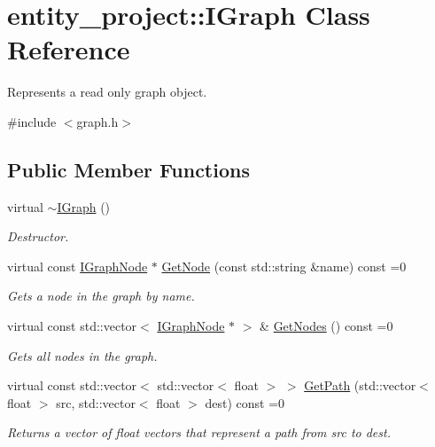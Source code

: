 \hypertarget{classentity__project_1_1IGraph}{}\section{entity\+\_\+project\+:\+:I\+Graph Class Reference}
\label{classentity__project_1_1IGraph}


Represents a read only graph object.  




{\ttfamily \#include $<$graph.\+h$>$}

\subsection*{Public Member Functions}
\begin{DoxyCompactItemize}
\item 
\mbox{\label{classentity__project_1_1IGraph_ad4eafcdb3b6902e54924a6c21e1971a0}} 
virtual \hyperlink{classentity__project_1_1IGraph_ad4eafcdb3b6902e54924a6c21e1971a0}{$\sim$\+I\+Graph} ()
\begin{DoxyCompactList}\small\item\em Destructor. \end{DoxyCompactList}\item 
\mbox{\label{classentity__project_1_1IGraph_a900c64b856e9163727693276fc870bd9}} 
virtual const \hyperlink{classentity__project_1_1IGraphNode}{I\+Graph\+Node} $\ast$ \hyperlink{classentity__project_1_1IGraph_a900c64b856e9163727693276fc870bd9}{Get\+Node} (const std\+::string \&name) const =0
\begin{DoxyCompactList}\small\item\em Gets a node in the graph by name. \end{DoxyCompactList}\item 
\mbox{\label{classentity__project_1_1IGraph_a690ed9b025c9b7709154c4fc7f89ef93}} 
virtual const std\+::vector$<$ \hyperlink{classentity__project_1_1IGraphNode}{I\+Graph\+Node} $\ast$ $>$ \& \hyperlink{classentity__project_1_1IGraph_a690ed9b025c9b7709154c4fc7f89ef93}{Get\+Nodes} () const =0
\begin{DoxyCompactList}\small\item\em Gets all nodes in the graph. \end{DoxyCompactList}\item 
virtual const std\+::vector$<$ std\+::vector$<$ float $>$ $>$ \hyperlink{classentity__project_1_1IGraph_aa96a691b82108d0901463f3cd5cd79b9}{Get\+Path} (std\+::vector$<$ float $>$ src, std\+::vector$<$ float $>$ dest) const =0
\begin{DoxyCompactList}\small\item\em Returns a vector of float vectors that represent a path from src to dest. \end{DoxyCompactList}\end{DoxyCompactItemize}


